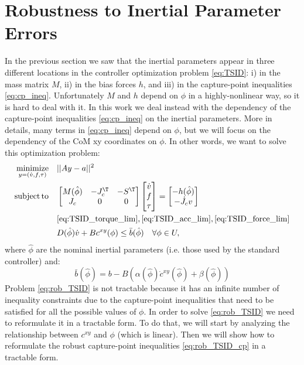 \section{Robustness to Inertial Parameter Errors}
\label{sec:robustness}
In the previous section we saw that the inertial parameters appear in three different locations in the controller optimization problem \eqref{eq:TSID}: i) in the mass matrix $M$, ii) in the bias forces $h$, and iii) in the capture-point inequalities \eqref{eq:cp_ineq}.
Unfortunately $M$ and $h$ depend on $\phi$ in a highly-nonlinear way, so it is hard to deal with it.
In this work we deal instead with the dependency of the capture-point inequalities \eqref{eq:cp_ineq} on the inertial parameters.
More in details, many terms in \eqref{eq:cp_ineq} depend on $\phi$, but we will focus on the dependency of the CoM xy coordinates on $\phi$.
In other words, we want to solve this optimization problem:
\begin{subequations} 
\label{eq:rob_TSID}
\begin{align} 
\minimize_{y=(\dot{v}, f, \tau)} \quad &|| A y - a||^2 \nonumber \\
\st \quad & \mat{M(\hat{\phi}) & -J_c^\T & -S^\T \\ J_c & 0 & 0} \mat{\dot{v} \\ f \\ \tau} = \mat{- h(\hat{\phi}) \\ -\dot{J}_c v} \\
& \eqref{eq:TSID_torque_lim}, \eqref{eq:TSID_acc_lim}, \eqref{eq:TSID_force_lim} \nonumber \\
& D(\hat{\phi}) \dot{v} + B c^{xy}(\phi) \le \bar{b}(\hat{\phi}) \quad \forall \phi \in U, \label{eq:rob_TSID_cp}
\end{align} 
\end{subequations}
where $\hat{\phi}$ are the nominal inertial parameters (i.e. those used by the standard controller) and:
$$
\bar{b}(\hat{\phi}) = b - B (\alpha(\hat{\phi}) \dot{c}^{xy}(\hat{\phi}) + \beta(\hat{\phi}))
$$
Problem \eqref{eq:rob_TSID} is not tractable because it has an infinite number of inequality constraints due to the capture-point inequalities that need to be satisfied for all the possible values of $\phi$.
In order to solve \eqref{eq:rob_TSID} we need to reformulate it in a tractable form.
To do that, we will start by analyzing the relationship between $c^{xy}$ and $\phi$ (which is linear).
Then we will show how to reformulate the robust capture-point inequalities \eqref{eq:rob_TSID_cp} in a tractable form.

